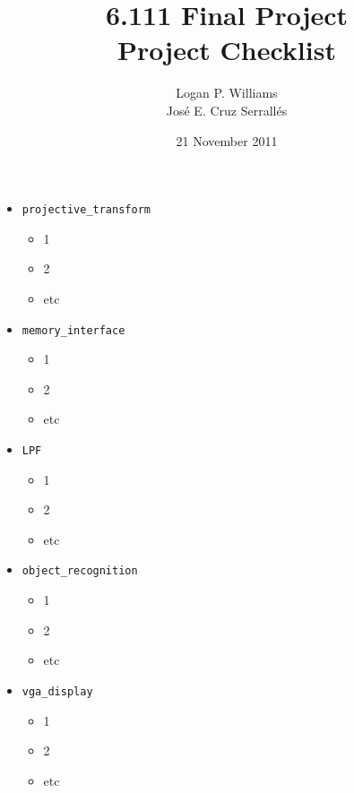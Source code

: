 \documentclass{article}
\title{6.111 Final Project\\Project Checklist}
\date{21 November 2011}
\author{Logan P. Williams\\Jos\'{e} E. Cruz Serrall\'{e}s}
\begin{document}
\maketitle

\begin{itemize}
\item[] {\tt projective\_transform}
	\begin{itemize}
	\item 1
	\item 2
	\item etc
	\end{itemize}

\item[] {\tt memory\_interface}
	\begin{itemize}
	\item 1
	\item 2
	\item etc
	\end{itemize}

\item[] {\tt LPF}
	\begin{itemize}
	\item 1
	\item 2
	\item etc
	\end{itemize}

\item[] {\tt object\_recognition}
	\begin{itemize}
	\item 1
	\item 2
	\item etc
	\end{itemize}

\item[] {\tt vga\_display}
	\begin{itemize}
	\item 1
	\item 2
	\item etc
	\end{itemize}

\end{itemize}
\end{document}
